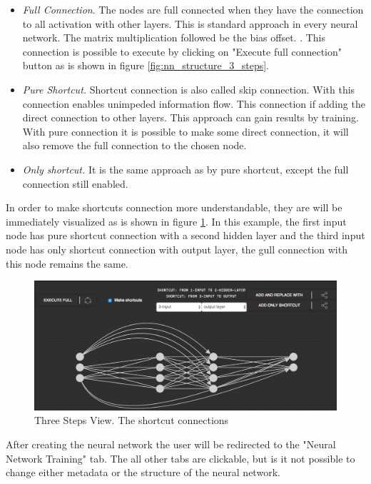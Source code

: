 \begin{itemize}
\item \emph{Full Connection}. The nodes are full connected when they have the connection to all activation with other layers. This is standard approach in every neural network. The matrix multiplication followed be the bias offset. \cite{nn_connection}. This connection is possible to execute by clicking on "Execute full connection" button as is shown in figure \ref{fig:nn_structure_3_steps}.
\item \emph{Pure Shortcut.} Shortcut connection is also called skip connection. With this connection enables unimpeded information flow. This connection if adding the direct connection to other layers. This approach can gain results by training. \cite{shortcuts_nn} With pure connection it is possible to make some direct connection, it will also remove the full connection to the chosen node.
\item \emph{Only shortcut.} It is the same approach as by pure shortcut, except the full connection still enabled. 
\end{itemize}

In order to make shortcuts connection more understandable, they are will be immediately visualized as is shown in figure \ref{fig:connection_3_steps}. In this example, the first input node has pure shortcut connection with a second hidden layer and the third input node has only shortcut connection with output layer, the gull connection with this node remains the same.

\begin{figure}[htbp]
\begin{center}
  \includegraphics[width=\linewidth]{components/5/img/connection_3_steps.png}
  \caption{Three Steps View. The shortcut connections}
  \label{fig:connection_3_steps}
\end{center}
\end{figure}

After creating the neural network the user will be redirected to the "Neural Network Training" tab. The all other tabs are clickable, but is it not possible to change either metadata or the structure of the neural network.

